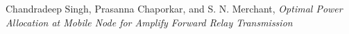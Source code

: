 \documentclass[conference]{IEEEtran}
\begin{document}

%
\begin{thebibliography}{1}

	\bibitem{} Chandradeep Singh, Prasanna Chaporkar, and S. N.
		Merchant, \emph{Optimal Power Allocation at Mobile Node for Amplify
		Forward Relay Transmission}

\end{thebibliography}




\end{document}
